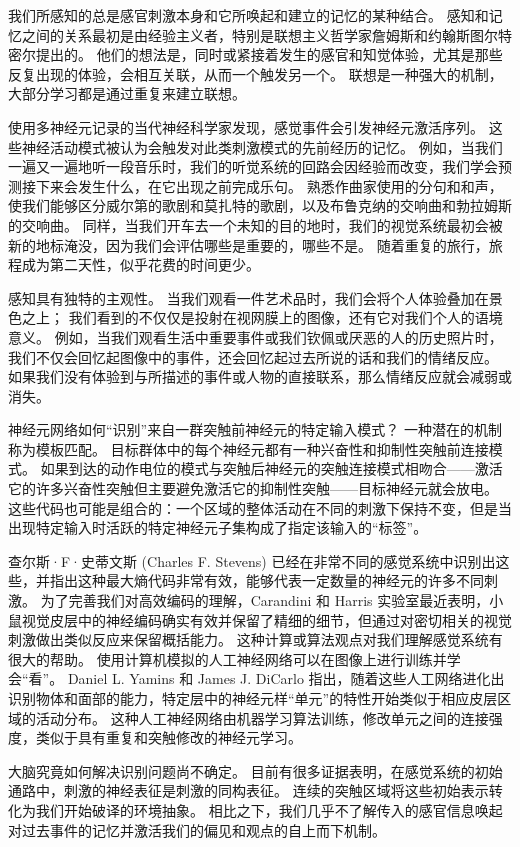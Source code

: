 我们所感知的总是感官刺激本身和它所唤起和建立的记忆的某种结合。 
感知和记忆之间的关系最初是由经验主义者，特别是联想主义哲学家詹姆斯和约翰斯图尔特密尔提出的。 
他们的想法是，同时或紧接着发生的感官和知觉体验，尤其是那些反复出现的体验，会相互关联，从而一个触发另一个。 
联想是一种强大的机制，大部分学习都是通过重复来建立联想。


使用多神经元记录的当代神经科学家发现，感觉事件会引发神经元激活序列。 
这些神经活动模式被认为会触发对此类刺激模式的先前经历的记忆。 
例如，当我们一遍又一遍地听一段音乐时，我们的听觉系统的回路会因经验而改变，我们学会预测接下来会发生什么，在它出现之前完成乐句。 
熟悉作曲家使用的分句和和声，使我们能够区分威尔第的歌剧和莫扎特的歌剧，以及布鲁克纳的交响曲和勃拉姆斯的交响曲。 
同样，当我们开车去一个未知的目的地时，我们的视觉系统最初会被新的地标淹没，因为我们会评估哪些是重要的，哪些不是。 
随着重复的旅行，旅程成为第二天性，似乎花费的时间更少。


感知具有独特的主观性。 
当我们观看一件艺术品时，我们会将个人体验叠加在景色之上； 我们看到的不仅仅是投射在视网膜上的图像，还有它对我们个人的语境意义。 
例如，当我们观看生活中重要事件或我们钦佩或厌恶的人的历史照片时，我们不仅会回忆起图像中的事件，还会回忆起过去所说的话和我们的情绪反应。 
如果我们没有体验到与所描述的事件或人物的直接联系，那么情绪反应就会减弱或消失。


神经元网络如何“识别”来自一群突触前神经元的特定输入模式？ 
一种潜在的机制称为模板匹配。 
目标群体中的每个神经元都有一种兴奋性和抑制性突触前连接模式。 
如果到达的动作电位的模式与突触后神经元的突触连接模式相吻合——激活它的许多兴奋性突触但主要避免激活它的抑制性突触——目标神经元就会放电。 
这些代码也可能是组合的：一个区域的整体活动在不同的刺激下保持不变，但是当出现特定输入时活跃的特定神经元子集构成了指定该输入的“标签”。


查尔斯·F·史蒂文斯 (Charles F. Stevens) 已经在非常不同的感觉系统中识别出这些，并指出这种最大熵代码非常有效，能够代表一定数量的神经元的许多不同刺激。 
为了完善我们对高效编码的理解，Carandini 和 Harris 实验室最近表明，小鼠视觉皮层中的神经编码确实有效并保留了精细的细节，但通过对密切相关的视觉刺激做出类似反应来保留概括能力。 
这种计算或算法观点对我们理解感觉系统有很大的帮助。 
使用计算机模拟的人工神经网络可以在图像上进行训练并学会“看”。 Daniel L. Yamins 和 James J. DiCarlo 指出，随着这些人工网络进化出识别物体和面部的能力，特定层中的神经元样“单元”的特性开始类似于相应皮层区域的活动分布。
这种人工神经网络由机器学习算法训练，修改单元之间的连接强度，类似于具有重复和突触修改的神经元学习。


大脑究竟如何解决识别问题尚不确定。 
目前有很多证据表明，在感觉系统的初始通路中，刺激的神经表征是刺激的同构表征。 
连续的突触区域将这些初始表示转化为我们开始破译的环境抽象。 
相比之下，我们几乎不了解传入的感官信息唤起对过去事件的记忆并激活我们的偏见和观点的自上而下机制。


